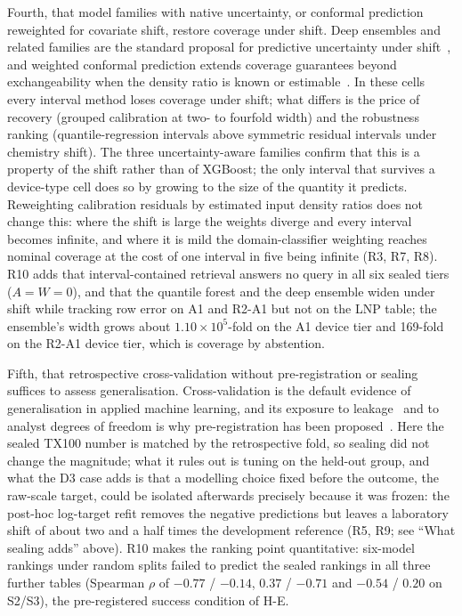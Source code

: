 \documentclass[11pt,a4paper]{article}
\newcommand{\tox}{TX100}
\begin{document}
Fourth, that model families with native uncertainty, or conformal prediction
reweighted for covariate shift, restore coverage under shift. Deep ensembles
and related families are the standard proposal for predictive uncertainty
under shift~\cite{lakshminarayanan2017,ovadia2019}, and weighted conformal
prediction extends coverage guarantees beyond exchangeability when the
density ratio is known or estimable~\cite{tibshirani2019,barber2023}. In
these cells every interval method loses coverage under shift; what differs
is the price of recovery (grouped calibration at two- to fourfold width) and
the robustness ranking (quantile-regression intervals above symmetric
residual intervals under chemistry shift). The three uncertainty-aware
families confirm that this is a property of the shift rather than of
XGBoost; the only interval that survives a device-type cell does so by
growing to the size of the quantity it predicts. Reweighting calibration
residuals by estimated input density ratios does not change this: where the
shift is large the weights diverge and every interval becomes infinite, and
where it is mild the domain-classifier weighting reaches nominal coverage at
the cost of one interval in five being infinite (R3, R7, R8). R10 adds that interval-contained retrieval answers no query in
all six sealed tiers ($A=W=0$), and
that the quantile forest and the deep ensemble widen under shift while
tracking row error on A1 and R2-A1 but not on the LNP table; the ensemble's
width grows about $1.10\times10^{5}$-fold on the A1 device tier and 169-fold
on the R2-A1 device tier, which is coverage by abstention.

Fifth, that retrospective cross-validation without pre-registration or
sealing suffices to assess generalisation. Cross-validation is the default
evidence of generalisation in applied machine learning, and its exposure to
leakage~\cite{kapoor2023} and to analyst degrees of freedom is why
pre-registration has been proposed~\cite{hofman2023,vepa2026}. Here the sealed \tox{} number
is matched by the retrospective fold, so sealing did not change the
magnitude; what it rules out is tuning on the held-out group, and what the D3
case adds is that a modelling choice fixed before the outcome, the raw-scale
target, could be isolated afterwards precisely because it was frozen: the
post-hoc log-target refit removes the negative predictions but leaves a
laboratory shift of about two and a half times the development reference
(R5, R9; see ``What sealing adds'' above). R10 makes the ranking point
quantitative: six-model rankings under random splits failed to predict the
sealed rankings in all three further tables (Spearman $\rho$ of
$-0.77$ / $-0.14$, $0.37$ / $-0.71$ and $-0.54$ / $0.20$ on S2/S3), the
pre-registered success condition of H-E.
\end{document}

